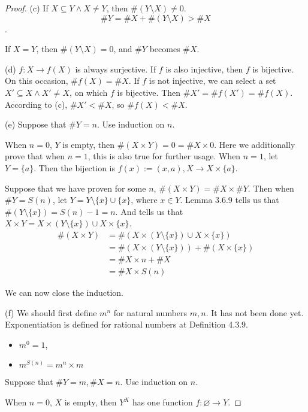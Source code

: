 \begin{proof}
(c)
If $X \subseteq Y \wedge X \neq Y$, then $\#(Y \setminus X) \neq 0$. 
\[
\#Y = \#X + \#(Y \setminus X) > \#X
\].

If $X = Y$, then $\#(Y \setminus X) = 0$, and $\#Y$ becomes $\#X$.

(d)
$f: X \rightarrow f(X)$ is always surjective. If $f$ is also injective, then $f$ is bijective. On this 
occasion, $\#f(X) = \#X$. If $f$ is not injective, we can select a set $X' \subseteq X \wedge X' \neq X$, 
on which $f$ is bijective. Then $\#X' = \#f(X') = \#f(X)$. According to (c), $\#X' < \#X$, so 
$\#f(X) < \#X$.

(e)
Suppose that $\#Y = n$. Use induction on $n$. 

When $n=0$, $Y$ is empty, then $\#(X \times Y) = 0 = \#X \times 0$. Here we additionally prove that 
when $n=1$, this is also true for further usage. When $n=1$, let $Y = \{a\}$. Then the bijection is 
$f(x):=(x,a), X \rightarrow X \times \{a\}$.

Suppose that we have proven for some $n$, $\#(X \times Y) = \#X \times \#Y$. Then when $\#Y = S(n)$, 
let $Y = Y\setminus\{x\}\cup\{x\}$, where $x \in Y$. Lemma 3.6.9 tells us that 
$\#(Y\setminus\{x\}) = S(n)-1 = n$. And  tells us that 
$X \times Y = X \times (Y\setminus\{x\}) \cup X \times \{x\}$. 
\begin{align*}
\#(X \times Y) 
&= \#(X \times (Y\setminus\{x\}) \cup X \times \{x\}) \\
&= \#(X \times (Y\setminus\{x\})) + \#(X \times \{x\}) \\
&= \#X \times n + \#X \\
&= \#X \times S(n)
\end{align*}

We can now close the induction.

(f)
We should first define $m^n$ for natural numbers $m,n$. It has not been done yet. Exponentiation is 
defined for rational numbers at Definition 4.3.9.
\begin{definition}
\begin{itemize}
\item $m^0=1$,
\item $m^{S(n)} = m^n \times m$
\end{itemize}
\end{definition}

Suppose that $\#Y = m,\#X = n$. Use induction on $n$. 

When $n=0$, $X$ is empty, then $Y^X$ has one function $f:\varnothing \rightarrow Y$.


\end{proof}
